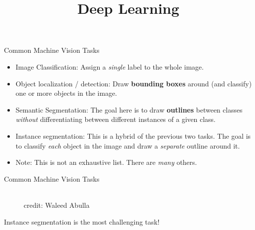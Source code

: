 





\newcommand{\titlefigure}{plots/05_conv_variations/3d/3dconv.png}
\newcommand{\learninggoals}{
  \item 1D Convolutions
  \item 2D Convolutions
  \item 3D Convolutions
}

\title{Deep Learning}
\date{}






\begin{frame} {Common Machine Vision Tasks}
  \begin{itemize}
    \item Image Classification: Assign a \textit{single} label to the whole image.
    \item Object localization / detection: Draw \textbf{bounding boxes} around (and classify) one or more objects in the image.
    \item Semantic Segmentation: The goal here is to draw \textbf{outlines} between classes \textit{without} differentiating between different instances of a given class.
    \item Instance segmentation: This is a hybrid of the previous two tasks. The goal is to classify \textit{each} object in the image and draw a \textit{separate} outline around it.
    \item Note: This is not an exhaustive list. There are \textit{many} others.
    \end{itemize}
\end{frame}


\begin{frame} {Common Machine Vision Tasks}
  \begin{figure}
    \centering
      \tiny{\\credit: Waleed Abulla}
  \end{figure}
    Instance segmentation is the most challenging task!
\end{frame}

